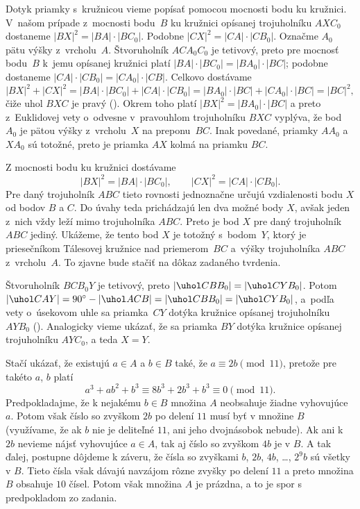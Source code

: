 {%
Dotyk priamky s~kružnicou vieme popísať pomocou mocnosti bodu ku kružnici.
V~našom prípade z~mocnosti bodu~$B$ ku kružnici opísanej trojuholníku $AXC_0$ dostaneme $|BX|^2 = |BA|\cdot|BC_0|$.
Podobne $|CX|^2=|CA|\cdot|CB_0|$.
%
Označme $A_0$ pätu výšky z~vrcholu~$A$. Štvoruholník $ACA_0C_0$ je tetivový, preto pre mocnosť bodu~$B$ k~jemu opísanej kružnici platí
$|BA|\cdot|BC_0| = |BA_0|\cdot|BC|$; podobne dostaneme $|CA|\cdot|CB_0| = |CA_0|\cdot|CB|$.
Celkovo dostávame
$$
|BX|^2 + |CX|^2 = |BA|\cdot|BC_0| + |CA|\cdot|CB_0| = |BA_0|\cdot|BC| + |CA_0|\cdot|BC| = |BC|^2,
$$
čiže uhol $BXC$ je pravý (\obr). Okrem toho platí $|BX|^2 = |BA_0|\cdot|BC|$ a preto z~Euklidovej vety o~odvesne v~pravouhlom trojuholníku $BXC$ vyplýva, že bod $A_0$ je pätou výšky z~vrcholu~$X$ na preponu~$BC$. Inak povedané, priamky $AA_0$ a $XA_0$ sú totožné, preto je priamka $AX$ kolmá na priamku $BC$.

\ineriesenie
Z mocnosti bodu ku kružnici dostávame
$$
|BX|^2 = |BA|\cdot|BC_0|, \qquad |CX|^2 = |CA|\cdot|CB_0|.
$$
Pre daný trojuholník $ABC$ tieto rovnosti jednoznačne určujú vzdialenosti bodu $X$ od bodov $B$ a $C$.
Do úvahy teda prichádzajú len dva možné body $X$, avšak jeden z~nich vždy leží mimo trojuholníka $ABC$.
Preto je bod $X$ pre daný trojuholník $ABC$ jediný.
Ukážeme, že tento bod $X$ je totožný s~bodom~$Y$, ktorý je priesečníkom Tálesovej kružnice nad priemerom~$BC$
a~výšky trojuholníka $ABC$ z~vrcholu~$A$. To zjavne bude stačiť na dôkaz zadaného tvrdenia.
%

Štvoruholník $BCB_0Y$ je tetivový, preto $|\uhol CBB_0| = |\uhol CYB_0|$. Potom $|\uhol CAY| = 90^\circ - |\uhol ACB| = |\uhol CBB_0| = |\uhol CYB_0|$, a~podľa vety o~úsekovom uhle sa priamka~$CY$ dotýka kružnice opísanej trojuholníku $AYB_0$ (\obr). Analogicky vieme ukázať, že sa priamka $BY$ dotýka kružnice opísanej trojuholníku $AYC_0$, a teda $X = Y$.
}

{%
Stačí ukázať, že existujú $a\in A$ a $b\in B$ také, že $a\equiv 2b\pmod {11}$,
pretože pre takéto $a$, $b$ platí
$$
a^3+ab^2+b^3\equiv 8b^3+2b^3+b^3\equiv 0\pmod {11}.
$$
Predpokladajme, že k nejakému $b\in B$ množina $A$ neobsahuje žiadne vyhovujúce $a$.
Potom však číslo so zvyškom $2b$ po delení $11$ musí byť v množine $B$
(využívame, že ak $b$ nie je deliteľné $11$, ani jeho dvojnásobok nebude).
Ak ani k $2b$ nevieme nájsť vyhovujúce $a\in A$, tak aj číslo so zvyškom $4b$ je v $B$.
A tak ďalej, postupne dôjdeme k záveru, že čísla so zvyškami $b$, $2b$, $4b$, \dots, $2^9b$ sú všetky v $B$.
Tieto čísla však dávajú navzájom rôzne zvyšky po delení $11$ a preto množina $B$ obsahuje $10$ čísel.
Potom však množina $A$ je prázdna, a to je spor s predpokladom zo zadania.
}

